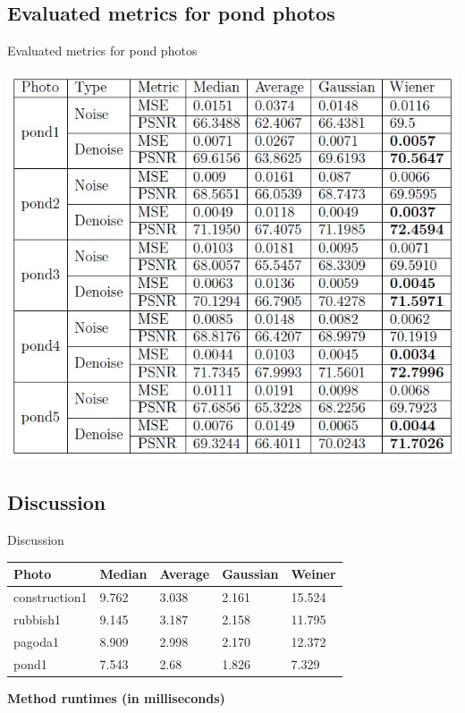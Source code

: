 \documentclass{beamer}
\begin{document}
\subsection{Evaluated metrics for pond photos}
\begin{frame}{Evaluated metrics for pond photos}
\begin{center}
\includegraphics{pon1.jpg}
\end{center}
\end{frame}

\subsection{Discussion}
\begin{frame}{Discussion}
\begin{center}
	\begin{tabular}{| l | l | l | l | l |}
		\hline
		Photo 			& Median 	& Average 	& Gaussian 	& Weiner 	\\ \hline
		construction1	& 9.762		& 3.038		& 2.161		& 15.524	\\ \hline
		rubbish1		& 9.145		& 3.187		& 2.158		& 11.795	\\ \hline
		pagoda1			& 8.909		& 2.998		& 2.170		& 12.372	\\ \hline
		pond1			& 7.543		& 2.68		& 1.826		& 7.329		\\ \hline
	\end{tabular}



\textbf{Method runtimes (in milliseconds)}

\end{center}
\end{frame}
\end{document}
